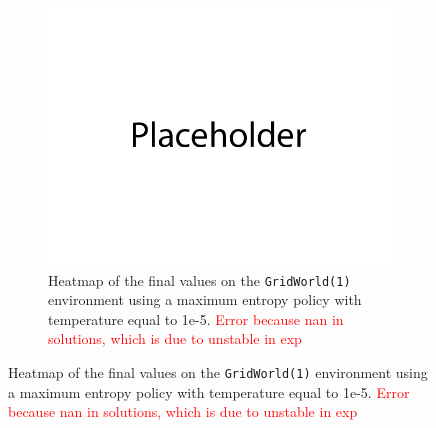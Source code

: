 \documentclass{article}
\begin{document}
\begin{enumerate}[(a)]
\begin{figure}[h!]
\begin{subfigure}{0.3\textwidth}
    \end{subfigure}
    \hspace{0.1 in}
     \begin{subfigure}{0.3\textwidth}
        \centering
        \includegraphics[width=\textwidth]{figures/placeholder.png}
        \caption{Heatmap of the final values on the \texttt{GridWorld(1)} environment using a maximum entropy policy with temperature equal to 1e-5.  \textcolor{red}{Error because nan in solutions, which is due to unstable in exp}}
    \end{subfigure}
\end{figure}


\end{enumerate}



\newpage 
{}
\end{document}
